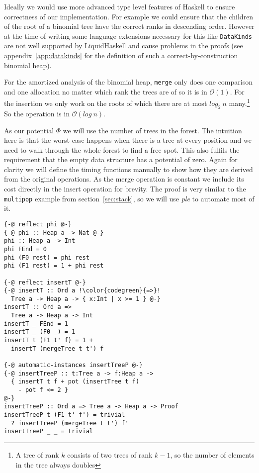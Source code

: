 \documentclass[sigplan,screen]{acmart}
\renewcommand\O[1]{$\mathcal{O}(#1)$}
\begin{document}
Ideally we would use more advanced type level features of Haskell to ensure correctness of our implementation. For example we could ensure that the children of the root of a binomial tree have the correct ranks in descending order. However at the time of writing some language extensions necessary for this like \texttt{DataKinds} are not well supported by LiquidHaskell and cause problems in the proofs (see appendix~\ref{app:datakinds} for the definition of such a correct-by-construction binomial heap).

For the amortized analysis of the binomial heap, \texttt{merge} only does one comparison and one allocation no matter which rank the trees are of so it is in \O{1}. For the insertion we only work on the roots of which there are at most $log_2 \: n$ many.\footnote{A tree of rank $k$ consists of two trees of rank $k - 1$, so the number of elements in the tree always doubles} So the operation is in \O{log \: n}.

As our potential $\Phi$ we will use the number of trees in the forest. The intuition here is that the worst case happens when there is a tree at every position and we need to walk through the whole forest to find a free spot. This also fulfils the requirement that the empty data structure has a potential of zero. Again for clarity we will define the timing functions manually to show how they are derived from the original operations. As the merge operation is constant we include its cost directly in the insert operation for brevity. The proof is very similar to the \texttt{multipop} example from section~\ref{sec:stack}, so we will use \textit{ple} to automate most of it.

\begin{lstlisting}[escapechar=!]
{-@ reflect phi @-}
{-@ phi :: Heap a -> Nat @-}
phi :: Heap a -> Int
phi FEnd = 0
phi (F0 rest) = phi rest
phi (F1 rest) = 1 + phi rest

{-@ reflect insertT @-}
{-@ insertT :: Ord a !\color{codegreen}{=>}!
  Tree a -> Heap a -> { x:Int | x >= 1 } @-}
insertT :: Ord a =>
  Tree a -> Heap a -> Int
insertT _ FEnd = 1
insertT _ (F0 _) = 1
insertT t (F1 t' f) = 1 +
  insertT (mergeTree t t') f

{-@ automatic-instances insertTreeP @-}
{-@ insertTreeP :: t:Tree a -> f:Heap a ->
  { insertT t f + pot (insertTree t f)
    - pot f <= 2 }
@-}
insertTreeP :: Ord a => Tree a -> Heap a -> Proof
insertTreeP t (F1 t' f') = trivial
  ? insertTreeP (mergeTree t t') f'
insertTreeP _ _ = trivial
\end{lstlisting}
\end{document}
